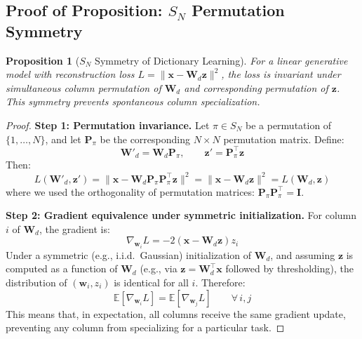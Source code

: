 \documentclass{article}
\newtheorem{proposition}[theorem]{Proposition}
\begin{document}
\subsection{Proof of Proposition: $S_N$ Permutation Symmetry}
\label{app:proof_sn}

\begin{proposition}[$S_N$ Symmetry of Dictionary Learning]
\label{prop:sn}
For a linear generative model with reconstruction loss $L = \|\mathbf{x} - \mathbf{W}_d \mathbf{z}\|^2$, the loss is invariant under simultaneous column permutation of $\mathbf{W}_d$ and corresponding permutation of $\mathbf{z}$. This symmetry prevents spontaneous column specialization.
\end{proposition}

\begin{proof}
\textbf{Step 1: Permutation invariance.}
Let $\pi \in S_N$ be a permutation of $\{1, \ldots, N\}$, and let $\mathbf{P}_\pi$ be the corresponding $N \times N$ permutation matrix. Define:
\begin{equation}
    \mathbf{W}'_d = \mathbf{W}_d \mathbf{P}_\pi, \qquad \mathbf{z}' = \mathbf{P}_\pi^\top \mathbf{z}
\end{equation}
Then:
\begin{equation}
    L(\mathbf{W}'_d, \mathbf{z}') = \|\mathbf{x} - \mathbf{W}_d \mathbf{P}_\pi \mathbf{P}_\pi^\top \mathbf{z}\|^2 = \|\mathbf{x} - \mathbf{W}_d \mathbf{z}\|^2 = L(\mathbf{W}_d, \mathbf{z})
\end{equation}
where we used the orthogonality of permutation matrices: $\mathbf{P}_\pi \mathbf{P}_\pi^\top = \mathbf{I}$.

\textbf{Step 2: Gradient equivalence under symmetric initialization.}
For column $i$ of $\mathbf{W}_d$, the gradient is:
\begin{equation}
    \nabla_{\mathbf{w}_i} L = -2(\mathbf{x} - \mathbf{W}_d \mathbf{z}) z_i
\end{equation}
Under a symmetric (e.g., i.i.d.\ Gaussian) initialization of $\mathbf{W}_d$, and assuming $\mathbf{z}$ is computed as a function of $\mathbf{W}_d$ (e.g., via $\mathbf{z} = \mathbf{W}_d^\top \mathbf{x}$ followed by thresholding), the distribution of $(\mathbf{w}_i, z_i)$ is identical for all $i$. Therefore:
\begin{equation}
    \mathbb{E}[\nabla_{\mathbf{w}_i} L] = \mathbb{E}[\nabla_{\mathbf{w}_j} L] \qquad \forall \, i, j
\end{equation}
This means that, in expectation, all columns receive the same gradient update, preventing any column from specializing for a particular task.


\end{proof}
\end{document}
